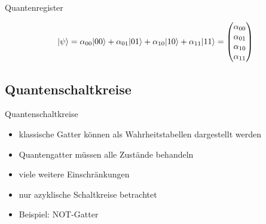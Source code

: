 \documentclass[xcolor=colortbl
,ngerman
]{beamer}
\begin{document}
\begin{frame}{Quantenregister}
    \begin{example}
    \[
    \left|\psi\right\rangle = \alpha_{00} |00\rangle + \alpha_{01} |01\rangle + \alpha_{10} |10\rangle + \alpha_{11} |11\rangle = 
\begin{pmatrix}
    \alpha_{00}  \\
    \alpha_{01}  \\
    \alpha_{10}  \\
    \alpha_{11}  \\
\end{pmatrix}
    \]
    \end{example}
\end{frame}

\subsection{Quantenschaltkreise}
\begin{frame}{Quantenschaltkreise}
    \begin{itemize}
        \item klassische Gatter können als Wahrheitstabellen dargestellt werden
        \item Quantengatter müssen alle Zustände behandeln
        \item viele weitere Einschränkungen 
        \item nur azyklische Schaltkreise betrachtet
        \item Beispiel: NOT-Gatter
    \end{itemize}
\end{frame}
\end{document}
